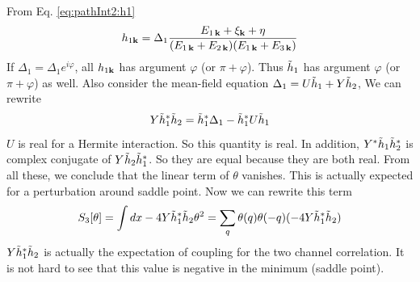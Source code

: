 From Eq. \ref{eq:pathInt2:h1}
\begin{equation*}
 h_{1\mathbf{k}}=\Delta_{1}\frac{E_{1\,\mathbf{k}}+\xi_{\mathbf{k}}+\eta}{(E_{1\,\mathbf{k}}+E_{2\,\mathbf{k}})(E_{1\,\mathbf{k}}+E_{3\,\mathbf{k}})}
\end{equation*}
If $\Delta_{1}=\Delta_{1}e^{i\varphi}$, all $h_{1\mathbf{k}}$ has argument $\varphi$ (or $\pi+\varphi$). Thus $\tilde{h}_{1}$ has argument $\varphi$ (or $\pi+\varphi$) as well.  Also consider the mean-field equation  $\Delta_{1}=U\tilde{h}_{1}+Y\tilde{h}_{2}$, We can rewrite 
\begin{equation}
Y\tilde{h}_{1}^{*}\tilde{h}_{2}=\tilde{h}_{1}^{*}\Delta_{1}-\tilde{h}_{1}^{*}U\tilde{h}_{1}
\end{equation}
$U$ is real for a Hermite interaction.  So this quantity is real.  In addition,  $Y^{*}\tilde{h}_{1}\tilde{h}_{2}^{*}$ is complex conjugate of $Y^{}\tilde{h}_{2}\tilde{h}_{1}^{*}$. So they are equal because they are both real.  From all these, we conclude that the linear term of $\theta$ vanishes.  This is actually expected for a perturbation around saddle point.  Now we can rewrite this term
\begin{equation}
S_{3}[\theta]=\int{dx}-4Y\tilde{h}_{1}^{*}\tilde{h}_{2}\theta^{2}=\sum_{q}\theta({q})\theta({-q})(-4Y\tilde{h}_{1}^{*}\tilde{h}_{2})
\end{equation}
$Y\tilde{h}_{1}^{*}\tilde{h}_{2}$ is actually the expectation of coupling for the two channel correlation.  It is not hard to see that this value  is negative in the minimum (saddle point).  

